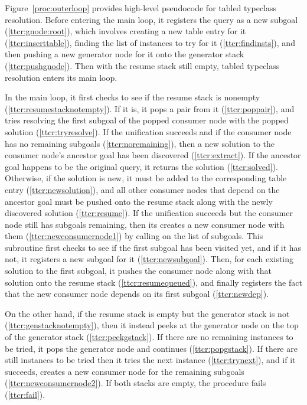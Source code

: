 \documentclass[runningheads]{llncs}
\begin{document}
Figure~\ref{proc:outerloop} provides high-level pseudocode for tabled typeclass resolution.
Before entering the main loop, it registers the query as a new subgoal (\ref{ttcr:gnode:root}),
which involves creating a new table entry for it (\ref{ttcr:inserttable}), finding the list of instances to try for it (\ref{ttcr:findinsts}),
and then pushing a new generator node for it onto the generator stack (\ref{ttcr:pushgnode}).
Then with the resume stack still empty, tabled typeclass resolution enters its main loop.

In the main loop, it first checks to see if the resume stack is nonempty (\ref{ttcr:resumestacknotempty}).
If it is, it pops a pair from it (\ref{ttcr:poppair}), and tries resolving the first subgoal of the popped consumer node
with the popped solution (\ref{ttcr:tryresolve}).
If the unification succeeds and if the consumer node has no remaining subgoals (\ref{ttcr:noremaining}), then a new solution to the consumer node's ancestor goal has been discovered (\ref{ttcr:extract}).
If the ancestor goal happens to be the original query, it returns the solution (\ref{ttcr:solved}).
Otherwise, if the solution is new, it must be added to the corresponding table entry (\ref{ttcr:newsolution}),
and all other consumer nodes that depend on the ancestor goal must be pushed onto the resume stack along with the newly discovered solution (\ref{ttcr:resume}).
If the unification succeeds but the consumer node still has subgoals remaining,
then its creates a new consumer node with them (\ref{ttcr:newconsumernode1})
by calling  on the list of subgoals.
This subroutine first checks to see if the first subgoal has been visited yet, and if it has not, it registers a new subgoal for it (\ref{ttcr:newsubgoal}).
Then, for each existing solution to the first subgoal, it pushes the consumer node along with that solution onto the resume stack (\ref{ttcr:resumequeued}), and finally registers the fact that the new consumer node depends on its first subgoal (\ref{ttcr:newdep}).

On the other hand, if the resume stack is empty but the generator stack is not (\ref{ttcr:genstacknotempty}),
then it instead peeks at the generator node on the top of the generator stack (\ref{ttcr:peekgstack}).
If there are no remaining instances to be tried, it pops the generator node and continues (\ref{ttcr:popgstack}).
If there are still instances to be tried then it tries the next instance (\ref{ttcr:trynext}), and if it succeeds, creates a new consumer node for the remaining subgoals (\ref{ttcr:newconsumernode2}).
If both stacks are empty, the procedure fails (\ref{ttcr:fail}).
\end{document}
